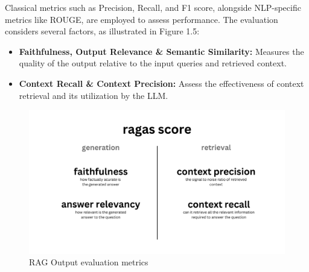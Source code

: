 Classical metrics such as Precision, Recall, and F1 score, alongside NLP-specific metrics like ROUGE, are employed to assess performance. The evaluation considers several factors, as illustrated in Figure 1.5:
\begin{itemize}
    \item \textbf{Faithfulness, Output Relevance \& Semantic Similarity:} Measures the quality of the output relative to the input queries and retrieved context.
    \item \textbf{Context Recall \& Context Precision:} Assess the effectiveness of context retrieval and its utilization by the LLM.
\end{itemize}
\begin{figure}[H]
    \centering
    \includegraphics[width=0.56\linewidth]{images/rag-eval.png}
    \caption{RAG Output evaluation metrics ~\cite{cardenas2023rag}}
    \label{fig:autoregressive_decoding}
\end{figure}

